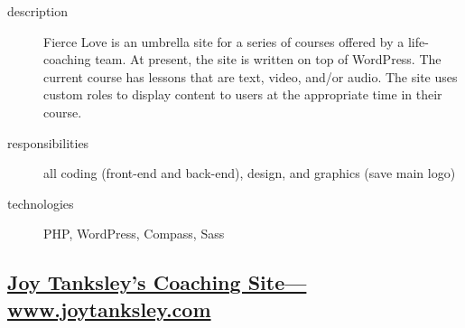 \documentclass{article}
\begin{document}
\begin{multicols}{2}

\begin{description}
  \item[description] Fierce Love is an umbrella site for a series of courses offered by a life-coaching team.  At present, the site is written on top of WordPress.  The current course has lessons that are text, video, and/or audio.  The site uses custom roles to display content to users at the appropriate time in their course.
  \item[responsibilities] all coding (front-end and back-end), design, and graphics (save main logo)
  \item[technologies] PHP, WordPress, Compass, Sass
\end{description}

\vfill
\columnbreak
{}
\end{multicols}


\subsection{\href{http://www.joytanksley.com}
  {Joy Tanksley's Coaching Site---www.joytanksley.com}}
\label{sub:Joy Tanksley's Coaching Site}
\end{document}
